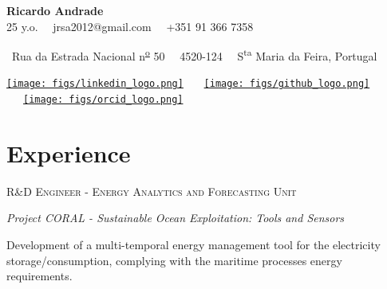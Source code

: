 \documentclass{mycv}
\begin{document}
\begin{center}
	{\LARGE\textbf{Ricardo Andrade}} \\
	\vspace{0.2cm}
	25 y.o.~\textbullet
	\ jrsa2012@gmail.com~\textbullet 
	\ +351 91 366 7358
	
	\ Rua da Estrada Nacional n\textsuperscript{\underline{o}} 50~\textbullet
	\ 4520-124~\textbullet
	\ S\textsuperscript{ta} Maria da Feira, Portugal
	
	\vspace{0.3cm}
	
	\href{www.linkedin.com/in/jrsa2012}{\texttt{[image: figs/linkedin\_logo.png]}}
	\ \ \
	\href{https://github.com/jrsa2012}{\texttt{[image: figs/github\_logo.png]}}
	\ \ \
	\href{https://orcid.org/0000-0001-8170-8235}{\texttt{[image: figs/orcid\_logo.png]}}

\end{center}


\section{Experience}
\textsc{R\&D Engineer - Energy Analytics and Forecasting Unit}

\begin{myitemize}
	\item \textit{Project CORAL - Sustainable Ocean Exploitation: Tools and Sensors}
	
	Development of a multi-temporal energy management tool for the electricity
	storage/consumption, complying with the maritime processes energy
	requirements.
	
	
\end{myitemize}


\end{document}
